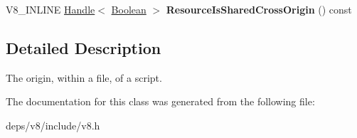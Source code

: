 \begin{DoxyCompactItemize}
\item 
\hypertarget{classv8_1_1_script_origin_a632d2d30405d42512af609861e486bf2}{}V8\+\_\+\+I\+N\+L\+I\+N\+E \hyperlink{classv8_1_1_handle}{Handle}$<$ \hyperlink{classv8_1_1_boolean}{Boolean} $>$ {\bfseries Resource\+Is\+Shared\+Cross\+Origin} () const \label{classv8_1_1_script_origin_a632d2d30405d42512af609861e486bf2}

\end{DoxyCompactItemize}


\subsection{Detailed Description}
The origin, within a file, of a script. 

The documentation for this class was generated from the following file\+:\begin{DoxyCompactItemize}
\item 
deps/v8/include/v8.\+h\end{DoxyCompactItemize}
